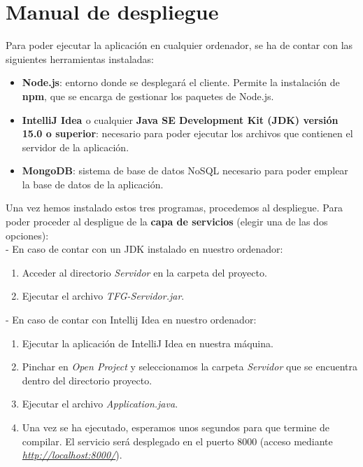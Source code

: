 \section{Manual de despliegue}

Para poder ejecutar la aplicación en cualquier ordenador, se ha de contar con las siguientes herramientas instaladas:
\begin{itemize}
\item {\bf Node.js}: entorno donde se desplegará el cliente. Permite la instalación de {\bf npm}, que se encarga de gestionar los paquetes de Node.js.
\item {\bf IntelliJ Idea \cite{intellij}} o cualquier {\bf Java SE Development Kit (JDK) \cite{jdk} versión 15.0 o superior}: necesario para poder ejecutar los archivos que contienen el servidor de la aplicación.
\item {\bf MongoDB}: sistema de base de datos NoSQL necesario para poder emplear la base de datos de la aplicación.
\end{itemize}

Una vez hemos instalado estos tres programas, procedemos al despliegue. Para poder proceder al despligue de la {\bf capa de servicios} (elegir una de las dos opciones):
\\

- En caso de contar con un JDK instalado en nuestro ordenador:
\begin{enumerate}
\item Acceder al directorio {\it Servidor} en la carpeta del proyecto.
\item Ejecutar el archivo {\it TFG-Servidor.jar}.
\end{enumerate}

- En caso de contar con Intellij Idea en nuestro ordenador:
\begin{enumerate}
\item Ejecutar la aplicación de IntelliJ Idea en nuestra máquina.
\item Pinchar en {\it Open Project} y seleccionamos la carpeta {\it Servidor} que se encuentra dentro del directorio proyecto.
\item Ejecutar el archivo {\it Application.java}.
\item Una vez se ha ejecutado, esperamos unos segundos para que termine de compilar. El servicio será desplegado en el puerto 8000 (acceso mediante {\it \url{http://localhost:8000/}}).
\end{enumerate}

